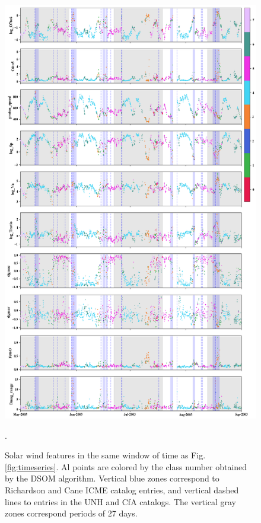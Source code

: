 \documentclass[utf8]{frontiersSCNS} %
\begin{document}
\begin{figure}[h!]
	\begin{center}
		\includegraphics[width=18cm]{Roberts/tsfeatures-som}%
	\end{center}
	\caption{Solar wind features in the same window of time as Fig.\ref{fig:timeseries}. Al points are colored by the class number obtained by the DSOM algorithm. Vertical blue zones correspond to Richardson and Cane ICME catalog entries, and vertical dashed lines to entries in the UNH and CfA catalogs. The vertical gray zones correspond periods of 27 days.}\label{fig:tsfeatures-som}.
\end{figure}
\end{document}
